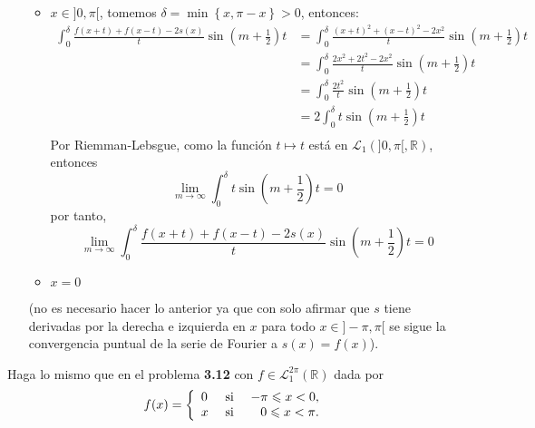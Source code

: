 \documentclass[12pt]{report}
\theoremstyle{largebreak}
\renewcommand{\leq}{\ensuremath{\leqslant}}
\begin{document}
\begin{sol}
\begin{itemize}
\begin{itemize}
\begin{equation*}
                \end{equation*}
                \item $x\in]0,\pi[$, tomemos $\delta=\min\left\{x,\pi-x\right\}>0$, entonces:
                \begin{equation*}
                    \begin{split}
                        \int_{0}^\delta\frac{f(x+t)+f(x-t)-2s(x)}{t}\sin\left(m+\frac{1}{2}\right)t&=\int_{0}^{\delta}\frac{(x+t)^2+(x-t)^2-2x^2}{t}\sin\left(m+\frac{1}{2}\right)t\\
                        &=\int_{0}^{\delta}\frac{2x^2+2t^2-2x^2}{t}\sin\left(m+\frac{1}{2}\right)t\\
                        &=\int_{0}^{\delta}\frac{2t^2}{t}\sin\left(m+\frac{1}{2}\right)t\\
                        &=2\int_{0}^{\delta}t\sin\left(m+\frac{1}{2}\right)t\\
                    \end{split}
                \end{equation*}
                Por Riemman-Lebsgue, como la función $t\mapsto t$ está en $\mathcal{L}_1(]0,\pi[,\mathbb{R})$, entonces
                \begin{equation*}
                    \lim_{ m\rightarrow\infty}\int_{0}^{\delta}t\sin\left(m+\frac{1}{2}\right)t=0
                \end{equation*}
                por tanto,
                \begin{equation*}
                    \lim_{m\rightarrow\infty}\int_{0}^\delta\frac{f(x+t)+f(x-t)-2s(x)}{t}\sin\left(m+\frac{1}{2}\right)t=0
                \end{equation*}
                \item $x=0$
            \end{itemize}
            (no es necesario hacer lo anterior ya que con solo afirmar que $s$ tiene derivadas por la derecha e izquierda en $x$ para todo $x\in]-\pi,\pi[$ se sigue la convergencia puntual de la serie de Fourier a $s(x)=f(x)$).
        \end{itemize}
    \end{sol}

    \begin{excer}
        Haga lo mismo que en el problema \textbf{3.12} con $f\in\mathcal{L}_1^{2\pi}(\mathbb{R})$ dada por
        \begin{equation*}
            f(x)=\left\{ 
                \begin{array}{lcr}
                    0 & \textup{ si } & -\pi\leq x<0,\\
                    x & \textup{ si } & 0\leq x<\pi.\\
                \end{array}
            \right.
        \end{equation*}
    \end{excer}

    \begin{sol}
        
    \end{sol}
\end{document}
